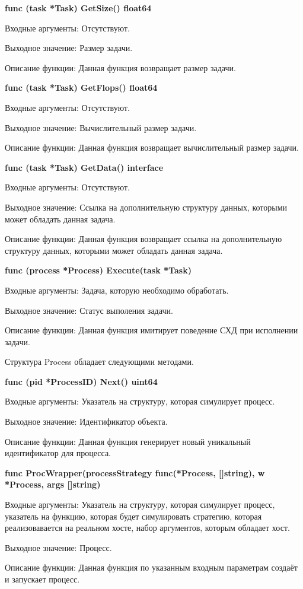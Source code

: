 \textbf{	func (task *Task) GetSize() float64 }

Входные аргументы: Отсутствуют.

Выходное значение: Размер задачи.

Описание функции: Данная функция возвращает размер задачи.

\textbf{	func (task *Task) GetFlops() float64}

Входные аргументы: Отсутствуют.

Выходное значение: Вычислительный размер задачи.

Описание функции: Данная функция возвращает вычислительный размер задачи.

\textbf{	func (task *Task) GetData() interface{} }

Входные аргументы: Отсутствуют.

Выходное значение: Ссылка на дополнительную структуру данных, которыми может обладать данная задача.

Описание функции: Данная функция возвращает ссылка на дополнительную структуру данных, которыми может обладать данная задача.

\textbf{	func (process *Process) Execute(task *Task) }

Входные аргументы: Задача, которую необходимо обработать.

Выходное значение: Статус выполения задачи.

Описание функции: Данная функция имитирует поведение СХД при исполнении задачи.


Структура Process обладает следующими методами.

\textbf{func (pid *ProcessID) Next() uint64}

Входные аргументы: Указатель на структуру, которая симулирует процесс.

Выходное значение: Идентификатор объекта.

Описание функции: Данная функция генерирует новый уникальный идентификатор для процесса.

\textbf{func ProcWrapper(processStrategy func(*Process, []string), w *Process, args []string)}

Входные аргументы: Указатель на структуру, которая симулирует процесс, указатель на функцию, которая будет симулировать стратегию, которая реализовавается на реальном хосте, набор аргументов, которым обладает хост.

Выходное значение: Процесс.

Описание функции: Данная функция по указанным входным параметрам создаёт и запускает процесс.


